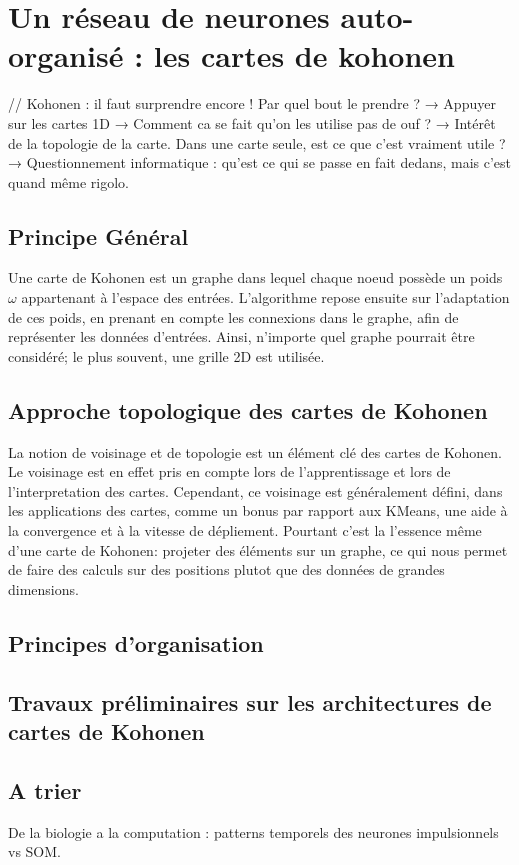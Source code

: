 \chapter{Un réseau de neurones auto-organisé : les cartes de kohonen}
\graphicspath{{01-Modularite/}}
// Kohonen : il faut surprendre encore ! Par quel 
bout le prendre ? 
→ Appuyer sur les cartes 1D
→ Comment ca se fait qu’on les utilise pas de ouf ? 
→  Intérêt de la topologie de la carte. Dans une carte seule, est ce que c’est vraiment utile ?
→ Questionnement informatique : qu’est ce qui se passe en fait dedans, mais c’est quand même rigolo.

\section{Principe Général}
Une carte de Kohonen est un graphe dans lequel chaque noeud possède un poids $\omega$ appartenant à l'espace des entrées. L'algorithme repose ensuite sur l'adaptation de ces poids, en prenant en compte les connexions dans le graphe, afin de représenter les données d'entrées. 
Ainsi, n'importe quel graphe pourrait être considéré; le plus souvent, une grille 2D est utilisée.

\section{Approche topologique des cartes de Kohonen}

La notion de voisinage et de topologie est un élément clé des cartes de Kohonen. Le voisinage est en effet pris en compte lors de l'apprentissage et lors de l'interpretation des cartes. Cependant, ce voisinage est généralement défini, dans les applications des cartes, comme un bonus par rapport aux KMeans, une aide à la convergence et à la vitesse de dépliement. Pourtant c'est la l'essence même d'une carte de Kohonen: projeter des éléments sur un graphe, ce qui nous permet de faire des calculs sur des positions plutot que des données de grandes dimensions. 

\section{Principes d'organisation}


\section{Travaux préliminaires sur les architectures de cartes de Kohonen}

\section{A trier}
De la biologie a la computation : patterns temporels des neurones impulsionnels vs SOM. 
